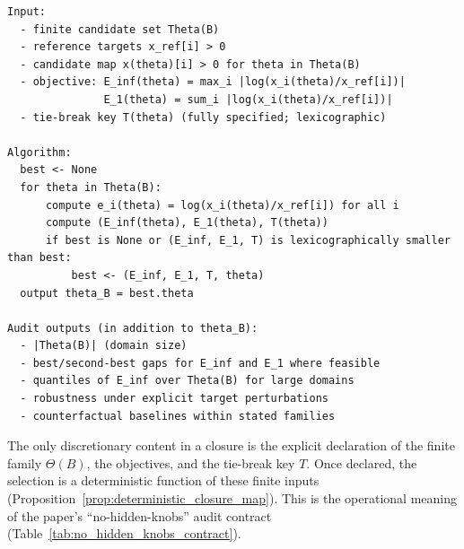 \begin{center}
\begin{minipage}{0.92\textwidth}
\begin{Verbatim}
Input:
  - finite candidate set Theta(B)
  - reference targets x_ref[i] > 0
  - candidate map x(theta)[i] > 0 for theta in Theta(B)
  - objective: E_inf(theta) = max_i |log(x_i(theta)/x_ref[i])|
               E_1(theta) = sum_i |log(x_i(theta)/x_ref[i])|
  - tie-break key T(theta) (fully specified; lexicographic)

Algorithm:
  best <- None
  for theta in Theta(B):
      compute e_i(theta) = log(x_i(theta)/x_ref[i]) for all i
      compute (E_inf(theta), E_1(theta), T(theta))
      if best is None or (E_inf, E_1, T) is lexicographically smaller than best:
          best <- (E_inf, E_1, T, theta)
  output theta_B = best.theta

Audit outputs (in addition to theta_B):
  - |Theta(B)| (domain size)
  - best/second-best gaps for E_inf and E_1 where feasible
  - quantiles of E_inf over Theta(B) for large domains
  - robustness under explicit target perturbations
  - counterfactual baselines within stated families
\end{Verbatim}
\end{minipage}
\end{center}

\begin{remark}\label{rem:no_hidden_knobs_template}
The only discretionary content in a closure is the explicit declaration of the finite family $\Theta(B)$, the objectives, and the tie-break key $T$.
Once declared, the selection is a deterministic function of these finite inputs (Proposition~\ref{prop:deterministic_closure_map}).
This is the operational meaning of the paper's ``no-hidden-knobs'' audit contract (Table~\ref{tab:no_hidden_knobs_contract}).
\end{remark}


